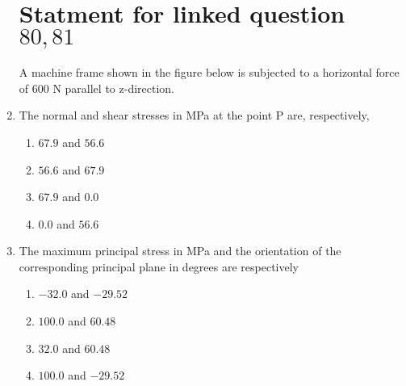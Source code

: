 \documentclass[journal,12pt,twocolumn]{IEEEtran}
\theoremstyle{remark}
\begin{document}
\begin{enumerate}[start=69]
                        \section{Statment for linked question $80,81$}
                        A machine frame shown in the figure below is subjected to a horizontal force of 600 N parallel to z-direction.
                       
                        \item The normal and shear stresses in MPa at the point P are, respectively,
                        \begin{enumerate}
                            \item $67.9$ and $56.6$
                            \item $56.6$ and $67.9$
                            \item $67.9$ and $0.0$
                            \item $0.0$ and $56.6$
                        \end{enumerate}
                        \item  The maximum principal stress in MPa and the orientation of the corresponding principal plane in degrees are respectively
                            \begin{enumerate}
                               \item  $-32.0$ and $-29.52 $
                               \item  $100.0$ and $60.48 $
                               \item  $32.0$ and $60.48$ 
                               \item  $100.0$ and $-29.52$
                            \end{enumerate}

\end{enumerate}
\end{document}
